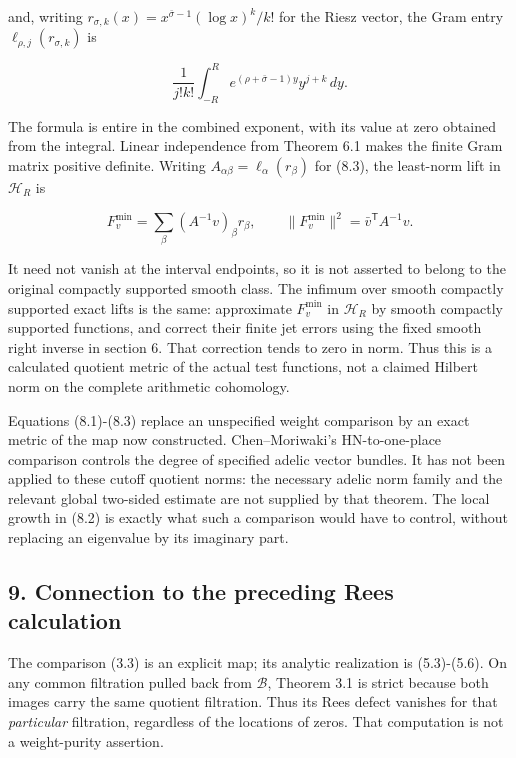 \documentclass[
]{article}
\begin{document}
and, writing \(r_{\sigma,k}(x)=x^{\bar\sigma-1}(\log x)^k/k!\) for the
Riesz vector, the Gram entry \(\ell_{\rho,j}(r_{\sigma,k})\) is

\[
\boxed{
\frac1{j!k!}\int_{-R}^R e^{(\rho+\bar\sigma-1)y}y^{j+k}\,dy.
} \tag{8.3}
\]

The formula is entire in the combined exponent, with its value at zero
obtained from the integral. Linear independence from Theorem 6.1 makes
the finite Gram matrix positive definite. Writing
\(A_{\alpha\beta}=\ell_\alpha(r_\beta)\) for (8.3), the least-norm lift
in \(\mathcal H_R\) is

\[
F_v^{\min}=\sum_\beta(A^{-1}v)_\beta r_\beta,
\qquad \|F_v^{\min}\|^2=\bar v^{\mathsf T}A^{-1}v.
\]

It need not vanish at the interval endpoints, so it is not asserted to
belong to the original compactly supported smooth class. The infimum
over smooth compactly supported exact lifts is the same: approximate
\(F_v^{\min}\) in \(\mathcal H_R\) by smooth compactly supported
functions, and correct their finite jet errors using the fixed smooth
right inverse in section 6. That correction tends to zero in norm. Thus
this is a calculated quotient metric of the actual test functions, not a
claimed Hilbert norm on the complete arithmetic cohomology.

Equations (8.1)-(8.3) replace an unspecified weight comparison by an
exact metric of the map now constructed. Chen--Moriwaki's
HN-to-one-place comparison controls the degree of specified adelic
vector bundles. It has not been applied to these cutoff quotient norms:
the necessary adelic norm family and the relevant global two-sided
estimate are not supplied by that theorem. The local growth in (8.2) is
exactly what such a comparison would have to control, without replacing
an eigenvalue by its imaginary part.

\subsection{9. Connection to the preceding Rees
calculation}\label{connection-to-the-preceding-rees-calculation}

The comparison (3.3) is an explicit map; its analytic realization is
(5.3)-(5.6). On any common filtration pulled back from \(\mathscr B\),
Theorem 3.1 is strict because both images carry the same quotient
filtration. Thus its Rees defect vanishes for that \emph{particular}
filtration, regardless of the locations of zeros. That computation is
not a weight-purity assertion.
\end{document}
